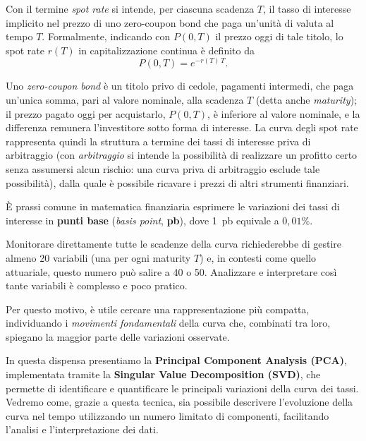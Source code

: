 \documentclass[11pt,a4paper]{article}
\theoremstyle{plain}
\theoremstyle{definition}
\theoremstyle{remark}
\begin{document}
Con il termine \emph{spot rate} si intende, per ciascuna scadenza $T$, il tasso
di interesse implicito nel prezzo di uno zero-coupon bond che paga un'unità di
valuta al tempo $T$. Formalmente, indicando con $P(0,T)$ il prezzo oggi di tale
titolo, lo spot rate $r(T)$ in capitalizzazione continua è definito da
\[
P(0,T) = e^{-r(T) \, T}.
\]

Uno \emph{zero-coupon bond} è un titolo privo di cedole, pagamenti intermedi, che paga un'unica somma,
pari al valore nominale, alla scadenza $T$ (detta anche \emph{maturity}); il
prezzo pagato oggi per acquistarlo, $P(0,T)$, è inferiore al valore nominale, e la
differenza remunera l'investitore sotto forma di interesse.
La curva degli spot rate rappresenta quindi la struttura a termine dei tassi
di interesse priva di arbitraggio (con \emph{arbitraggio} si intende la
possibilità di realizzare un profitto certo senza assumersi alcun rischio: una
curva priva di arbitraggio esclude tale possibilità), dalla quale è possibile
ricavare i prezzi di altri strumenti finanziari.


È prassi comune in matematica finanziaria esprimere le variazioni dei tassi di
interesse in \textbf{punti base} (\emph{basis point}, \textbf{pb}), dove 1~pb
equivale a $0{,}01\%$.

Monitorare direttamente tutte le scadenze della curva richiederebbe di gestire almeno 20 variabili (una per ogni maturity $T$) e, in contesti come quello attuariale, questo numero può salire a 40 o 50. Analizzare e interpretare così tante variabili è complesso e poco pratico.

Per questo motivo, è utile cercare una rappresentazione più compatta, individuando i \emph{movimenti fondamentali} della curva che, combinati tra loro, spiegano la maggior parte delle variazioni osservate. 

In questa dispensa presentiamo la \textbf{Principal Component Analysis (PCA)}, implementata tramite la \textbf{Singular Value Decomposition (SVD)}, che permette di identificare e quantificare le principali variazioni della curva dei tassi. Vedremo come, grazie a questa tecnica, sia possibile descrivere l'evoluzione della curva nel tempo utilizzando un numero limitato di componenti, facilitando l'analisi e l'interpretazione dei dati.
\end{document}
